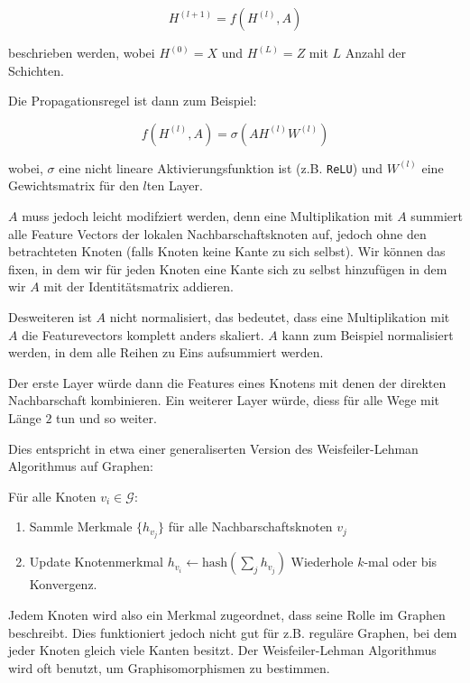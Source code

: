 \begin{equation}
  H^{(l+1)} = f(H^{(l)}, A)
\end{equation}

beschrieben werden, wobei $H^{(0)} = X$ und $H^{(L)} = Z$ mit $L$ Anzahl der Schichten.

Die Propagationsregel ist dann zum Beispiel:

\begin{equation}
  f(H^{(l)}, A) = \sigma(AH^{(l)}W^{(l)})
\end{equation}

wobei, $\sigma$ eine nicht lineare Aktivierungsfunktion ist (z.B. \texttt{ReLU}) und $W^{(l)}$ eine Gewichtsmatrix für den $l$ten Layer.

$A$ muss jedoch leicht modifziert werden, denn eine Multiplikation mit $A$ summiert alle Feature Vectors der lokalen Nachbarschaftsknoten auf, jedoch ohne den betrachteten Knoten (falls Knoten keine Kante zu sich selbst).
Wir können das fixen, in dem wir für jeden Knoten eine Kante sich zu selbst hinzufügen in dem wir $A$ mit der Identitätsmatrix addieren.

Desweiteren ist $A$ nicht normalisiert, das bedeutet, dass eine Multiplikation mit $A$ die Featurevectors komplett anders skaliert.
$A$ kann zum Beispiel normalisiert werden, in dem alle Reihen zu Eins aufsummiert werden.

Der erste Layer würde dann die Features eines Knotens mit denen der direkten Nachbarschaft kombinieren.
Ein weiterer Layer würde, diess für alle Wege mit Länge $2$ tun und so weiter.

Dies entspricht in etwa einer generaliserten Version des Weisfeiler-Lehman Algorithmus auf Graphen:

Für alle Knoten $v_i \in \mathcal{G}$:
\begin{enumerate}
  \item Sammle Merkmale $\lbrace h_{v_j} \rbrace$ für alle Nachbarschaftsknoten ${ v_j }$
  \item Update Knotenmerkmal $h_{v_i} \leftarrow \text{hash}(\sum_j h_{v_j})$
Wiederhole $k$-mal oder bis Konvergenz.
\end{enumerate}

Jedem Knoten wird also ein Merkmal zugeordnet, dass seine Rolle im Graphen beschreibt.
Dies funktioniert jedoch nicht gut für z.B. reguläre Graphen, bei dem jeder Knoten gleich viele Kanten besitzt.
Der Weisfeiler-Lehman Algorithmus wird oft benutzt, um Graphisomorphismen zu bestimmen.

